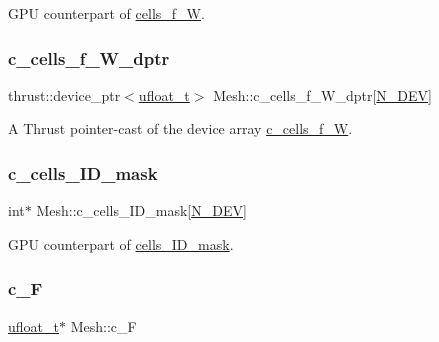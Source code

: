 G\+PU counterpart of \hyperlink{classMesh_a6b9285bbb403bd26c6e3a7fe6c93c593}{cells\+\_\+f\+\_\+W}. 

\mbox{\label{classMesh_a7d1752c2544e2fcba8242e024fe440c3}} 
\subsubsection{\texorpdfstring{c\+\_\+cells\+\_\+f\+\_\+\+W\+\_\+dptr}{c\_cells\_f\_W\_dptr}}
{\footnotesize\ttfamily thrust\+::device\+\_\+ptr$<$\hyperlink{cppspec_8h_af529d360dfac9b9578aa719418a53a21}{ufloat\+\_\+t}$>$ Mesh\+::c\+\_\+cells\+\_\+f\+\_\+\+W\+\_\+dptr\mbox{[}\hyperlink{cppspec_8h_a2b674dab7a14f1bf32b48b7fda5022dc}{N\+\_\+\+D\+EV}\mbox{]}}



A Thrust pointer-\/cast of the device array \hyperlink{classMesh_aa148542495502c0c42dfb462d6f41f02}{c\+\_\+cells\+\_\+f\+\_\+W}. 

\mbox{\label{classMesh_ae5305deb9718854c1b16bbfcf69f173a}} 
\subsubsection{\texorpdfstring{c\+\_\+cells\+\_\+\+I\+D\+\_\+mask}{c\_cells\_ID\_mask}}
{\footnotesize\ttfamily int$\ast$ Mesh\+::c\+\_\+cells\+\_\+\+I\+D\+\_\+mask\mbox{[}\hyperlink{cppspec_8h_a2b674dab7a14f1bf32b48b7fda5022dc}{N\+\_\+\+D\+EV}\mbox{]}}



G\+PU counterpart of \hyperlink{classMesh_a1bfac9e480361bfdd0daf46ad6e8ca79}{cells\+\_\+\+I\+D\+\_\+mask}. 

\mbox{\label{classMesh_ad166f6f55e4a13f49d2ba33598157756}} 
\subsubsection{\texorpdfstring{c\+\_\+F}{c\_F}}
{\footnotesize\ttfamily \hyperlink{cppspec_8h_af529d360dfac9b9578aa719418a53a21}{ufloat\+\_\+t}$\ast$ Mesh\+::c\+\_\+F}



